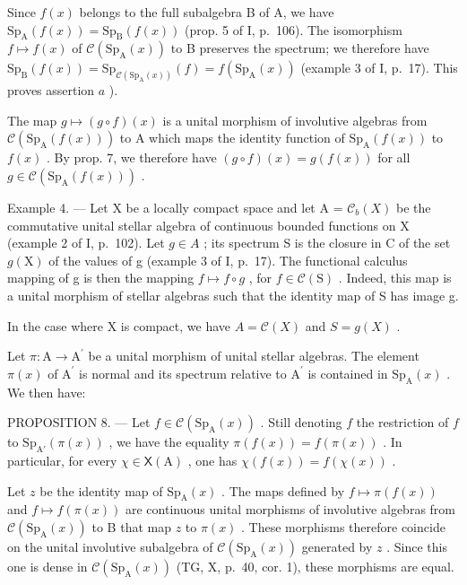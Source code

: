 Since \(f(x)\) belongs to the full subalgebra B of A, we have \(\mathrm{Sp}_{\mathrm{A}}(f(x)) = \mathrm{Sp}_{\mathrm{B}}(f(x))\) (prop. 5 of I, p.~106). The isomorphism \(f \mapsto f(x)\) of \(\mathcal{C}(\mathrm{Sp}_{\mathrm{A}}(x))\) to B preserves the spectrum; we therefore have \(\mathrm{Sp}_{\mathrm{B}}(f(x)) = \mathrm{Sp}_{\mathcal{C}(\mathrm{Sp}_{\mathrm{A}}(x))}(f) = f(\mathrm{Sp}_{\mathrm{A}}(x))\) (example 3 of I, p.~17). This proves assertion \(a\) ).

The map \(g \mapsto (g \circ f)(x)\) is a unital morphism of involutive algebras from \(\mathcal{C}(\mathrm{Sp}_{\mathrm{A}}(f(x)))\) to A which maps the identity function of \(\mathrm{Sp}_{\mathrm{A}}(f(x))\) to \(f(x)\) . By prop. 7, we therefore have \((g \circ f)(x) = g(f(x))\) for all \(g \in \mathcal{C}(\mathrm{Sp}_{\mathrm{A}}(f(x)))\) .

Example 4. --- Let X be a locally compact space and let A = \(\mathcal{C}_{b}(X)\) be the commutative unital stellar algebra of continuous bounded functions on X (example 2 of I, p.~102). Let \(g \in A\) ; its spectrum S is the closure in C of the set \(g(\mathrm{X})\) of the values of g (example 3 of I, p.~17). The functional calculus mapping of g is then the mapping \(f \mapsto f \circ g\) , for \(f \in \mathcal{C}(\mathrm{S})\) . Indeed, this map is a unital morphism of stellar algebras such that the identity map of S has image g.

In the case where X is compact, we have \(A = \mathcal{C}(X)\) and \(S = g(X)\) .

Let \(\pi\colon\mathrm{A}\to\mathrm{A}^{\prime}\) be a unital morphism of unital stellar algebras. The element \(\pi(x)\) of \(\mathrm{A}^{\prime}\) is normal and its spectrum relative to \(\mathrm{A}^{\prime}\) is contained in \(\mathrm{Sp}_{\mathrm{A}}(x)\) . We then have:

PROPOSITION 8. --- Let \(f \in \mathcal{C}(\mathrm{Sp}_{\mathrm{A}}(x))\) . Still denoting \(f\) the restriction of \(f\) to \(\mathrm{Sp}_{\mathrm{A}'}(\pi(x))\) , we have the equality \(\pi(f(x)) = f(\pi(x))\) . In particular, for every \(\chi \in \mathsf{X}(\mathrm{A})\) , one has \(\chi(f(x)) = f(\chi(x))\) .

Let \(z\) be the identity map of \(\mathrm{Sp}_{\mathrm{A}}(x)\) . The maps defined by \(f \mapsto \pi(f(x))\) and \(f \mapsto f(\pi(x))\) are continuous unital morphisms of involutive algebras from \(\mathcal{C}(\mathrm{Sp}_{\mathrm{A}}(x))\) to B that map \(z\) to \(\pi(x)\) . These morphisms therefore coincide on the unital involutive subalgebra of \(\mathcal{C}(\mathrm{Sp}_{\mathrm{A}}(x))\) generated by \(z\) . Since this one is dense in \(\mathcal{C}(\mathrm{Sp}_{\mathrm{A}}(x))\) (TG, X, p.~40, cor. 1), these morphisms are equal.

